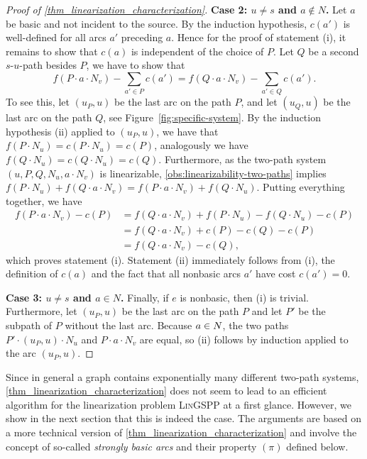 \begin{proof}[Proof of \cref{thm_linearization_characterization}]
    \textbf{Case 2: $u \neq s$ and $a \not\in N$.} Let $a$ be basic and not incident to the source. By the induction hypothesis, $c(a')$ is well-defined for all arcs $a'$ preceding $a$. Hence for the proof of statement (i), it remains to show that $c(a)$ is independent of the choice of $P$. Let $Q$ be a second $s$-$u$-path besides $P$, we have to show that 
    \[
    f(P \cdot a \cdot N_v) - \sum_{a' \in P}c(a') = f(Q \cdot a \cdot N_v) - \sum_{a' \in Q}c(a').
    \]
    To see this, let $(u_P, u)$ be the last arc on the path $P$, and let $(u_Q, u)$ be the last arc on the path $Q$, see Figure~\ref{fig:specific-system}. 
    By the induction hypothesis (ii) applied to $(u_P, u)$, we have that $f(P \cdot N_u) = c(P \cdot N_u) = c(P)$, analogously we have $f(Q \cdot N_u) = c(Q \cdot N_u) = c(Q)$. Furthermore, as  the two-path system $(u, P, Q, N_u, a \cdot N_v)$ is linearizable,  \cref{obs:linearizability-two-paths} implies  $f(P \cdot N_u) + f(Q \cdot a \cdot N_v) = f(P \cdot a \cdot N_v) + f(Q \cdot N_u)$. Putting everything together, we have
    \begin{align*}
         f(P \cdot a \cdot N_v) - c(P) &= f(Q \cdot a \cdot N_v) + f(P \cdot N_u) - f(Q \cdot N_u) - c(P)\\
         &= f(Q \cdot a \cdot N_v) + c(P) - c(Q) - c(P)\\
         &= f(Q \cdot a \cdot N_v) - c(Q),
    \end{align*}
    which proves statement (i). Statement (ii) immediately follows from (i), the definition of $c(a)$ and the fact that all nonbasic arcs $a'$ have cost $c(a') = 0$.
    
    \textbf{Case 3: $u \neq s$ and $a \in N$.} Finally, if $e$ is nonbasic, then (i) is trivial. Furthermore, let $(u_P, u)$ be the last arc on the path $P$ and let $P'$ be the subpath of $P$ without the last arc. Because $a \in N$, the two paths $P' \cdot (u_P, u) \cdot N_u$ and $P \cdot a \cdot N_v$ are equal, so (ii) follows by induction applied to the arc $(u_P, u)$.
\end{proof}

Since in general a graph contains exponentially many different two-path systems,   \cref{thm_linearization_characterization} does not seem to lead to  an  efficient algorithm for  the linearization problem \textsc{Lin}GSPP at a first glance. However, we show in the next section that this is indeed the case. The arguments  are based on a more technical version of \cref{thm_linearization_characterization} and involve the concept of  so-called \emph{strongly basic arcs} and their property $(\pi)$ defined below.

